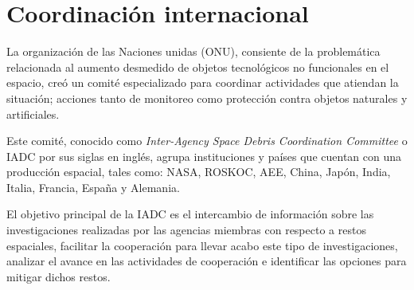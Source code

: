 \section*{Coordinación internacional} \label{sec:coordinacion}

La organización de las Naciones unidas (ONU), consiente de la problemática relacionada al aumento desmedido de objetos tecnológicos no funcionales en el espacio, creó un comité especializado para coordinar actividades que atiendan la situación;
acciones tanto de monitoreo como protección contra objetos naturales y artificiales.

Este comité, conocido como  \textit{Inter-Agency Space Debris Coordination Committee} o IADC por sus siglas en inglés, agrupa instituciones y países que cuentan con una producción espacial, tales como: NASA, ROSKOC, AEE, China, Japón, India, Italia, Francia, España y Alemania.

El objetivo principal de la IADC es el intercambio de información sobre las investigaciones realizadas por las agencias miembras con respecto a restos espaciales, 
facilitar la cooperación para llevar acabo este tipo de investigaciones, 
analizar el avance en las actividades de cooperación 
e identificar las opciones para mitigar dichos restos.

